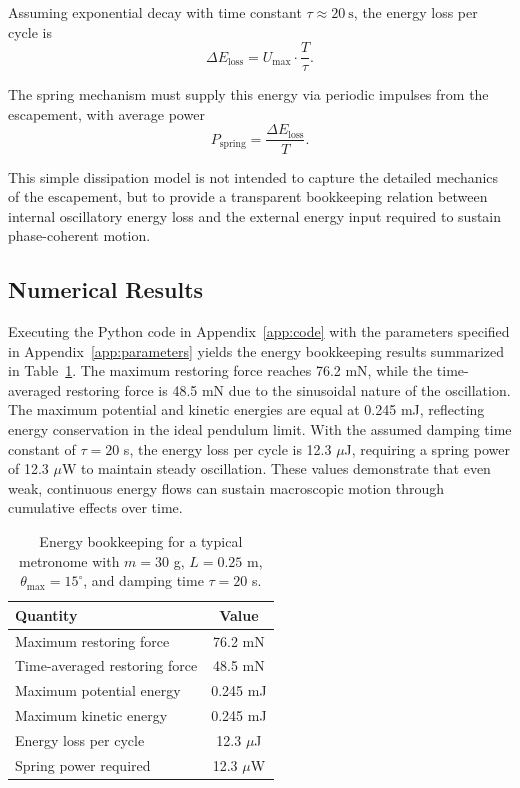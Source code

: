 \documentclass[%
 reprint,
 amsmath,amssymb,
 aps,
 prb,
]{revtex4-2}
\numberwithin{equation}{section}
\begin{document}
Assuming exponential decay with time constant $\tau \approx 20~\text{s}$, the energy loss per cycle is
\begin{equation}
\Delta E_\text{loss} = U_\text{max} \cdot \frac{T}{\tau}.
\label{eq:energy_loss}
\end{equation}

The spring mechanism must supply this energy via periodic impulses from the escapement, with average power
\begin{equation}
P_\text{spring} = \frac{\Delta E_\text{loss}}{T}.
\label{eq:spring_power}
\end{equation}

This simple dissipation model is not intended to capture the detailed mechanics of the escapement, but to provide a transparent bookkeeping relation between internal oscillatory energy loss and the external energy input required to sustain phase-coherent motion.

\subsection{Numerical Results}
\label{app:numerical}

Executing the Python code in Appendix~\ref{app:code} with the parameters specified in Appendix~\ref{app:parameters} yields the energy bookkeeping results summarized in Table~\ref{tab:metronome_energy}. The maximum restoring force reaches 76.2 mN, while the time-averaged restoring force is 48.5 mN due to the sinusoidal nature of the oscillation. The maximum potential and kinetic energies are equal at 0.245 mJ, reflecting energy conservation in the ideal pendulum limit. With the assumed damping time constant of $\tau = 20$ s, the energy loss per cycle is 12.3 $\mu$J, requiring a spring power of 12.3 $\mu$W to maintain steady oscillation. These values demonstrate that even weak, continuous energy flows can sustain macroscopic motion through cumulative effects over time.

\begin{table}[ht!]
\centering
\begin{tabular*}{\columnwidth}{@{\extracolsep{\fill}}lc@{}}
\toprule
\textbf{Quantity} & \textbf{Value} \\
\midrule
Maximum restoring force & 76.2 mN \\
Time-averaged restoring force & 48.5 mN \\
Maximum potential energy & 0.245 mJ \\
Maximum kinetic energy & 0.245 mJ \\
Energy loss per cycle & 12.3 $\mu$J \\
Spring power required & 12.3 $\mu$W \\
\bottomrule
\end{tabular*}
\caption{\justifying Energy bookkeeping for a typical metronome with $m=30$ g, $L=0.25$ m, $\theta_\text{max}=15^\circ$, and damping time $\tau=20$ s.}
\label{tab:metronome_energy}
\end{table}
\end{document}
